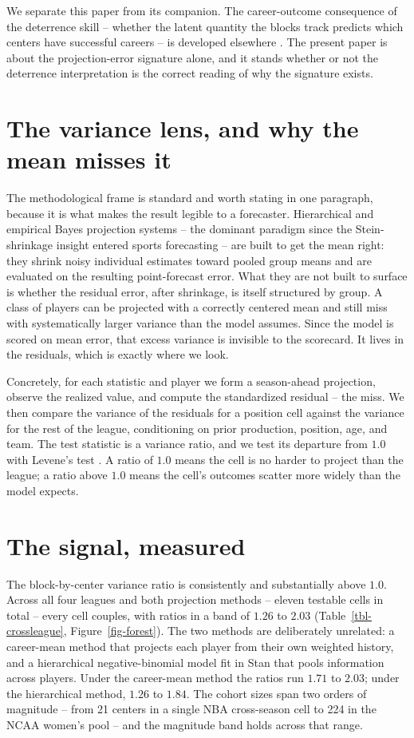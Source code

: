 \documentclass[11pt]{article}
\begin{document}
We separate this paper from its companion. The career-outcome consequence of the deterrence skill -- whether the latent quantity the blocks track predicts which centers have successful careers -- is developed elsewhere \citep{humphrey_deterrence}. The present paper is about the projection-error signature alone, and it stands whether or not the deterrence interpretation is the correct reading of why the signature exists.

\section{The variance lens, and why the mean misses it}\label{sec-lens}
The methodological frame is standard and worth stating in one paragraph, because it is what makes the result legible to a forecaster. Hierarchical and empirical Bayes projection systems -- the dominant paradigm since the Stein-shrinkage insight entered sports forecasting \citep{efron1977stein, brown2008season} -- are built to get the mean right: they shrink noisy individual estimates toward pooled group means and are evaluated on the resulting point-forecast error. What they are not built to surface is whether the residual error, after shrinkage, is itself structured by group. A class of players can be projected with a correctly centered mean and still miss with systematically larger variance than the model assumes. Since the model is scored on mean error, that excess variance is invisible to the scorecard. It lives in the residuals, which is exactly where we look.

Concretely, for each statistic and player we form a season-ahead projection, observe the realized value, and compute the standardized residual -- the miss. We then compare the variance of the residuals for a position cell against the variance for the rest of the league, conditioning on prior production, position, age, and team. The test statistic is a variance ratio, and we test its departure from $1.0$ with Levene's test \citep{levene1960}. A ratio of $1.0$ means the cell is no harder to project than the league; a ratio above $1.0$ means the cell's outcomes scatter more widely than the model expects.

\section{The signal, measured}\label{sec-measured}
The block-by-center variance ratio is consistently and substantially above $1.0$. Across all four leagues and both projection methods -- eleven testable cells in total -- every cell couples, with ratios in a band of $1.26$ to $2.03$ (Table~\ref{tbl-crossleague}, Figure~\ref{fig-forest}). The two methods are deliberately unrelated: a career-mean method that projects each player from their own weighted history, and a hierarchical negative-binomial model fit in Stan \citep{carpenter2017stan} that pools information across players. Under the career-mean method the ratios run $1.71$ to $2.03$; under the hierarchical method, $1.26$ to $1.84$. The cohort sizes span two orders of magnitude -- from 21 centers in a single NBA cross-season cell to 224 in the NCAA women's pool -- and the magnitude band holds across that range.
\end{document}
